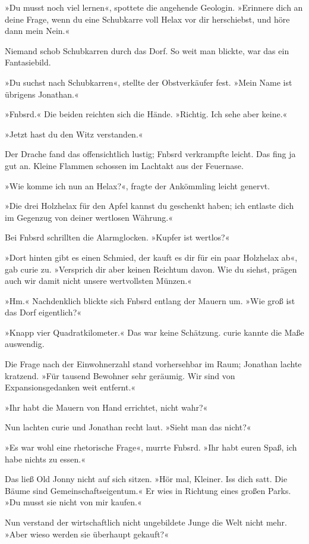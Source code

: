 »Du musst noch viel lernen«, spottete die angehende Geologin. »Erinnere dich an deine Frage, wenn du eine Schubkarre voll Helax vor dir herschiebst, und höre dann mein Nein.«

Niemand schob Schubkarren durch das Dorf. So weit man blickte, war das ein Fantasiebild.

»Du suchst nach Schubkarren«, stellte der Obstverkäufer fest. »Mein Name ist übrigens Jonathan.«

»Fnbsrd.« Die beiden reichten sich die Hände. »Richtig. Ich sehe aber keine.«

»Jetzt hast du den Witz verstanden.«

Der Drache fand das offensichtlich lustig; Fnbsrd verkrampfte leicht. Das fing ja gut an. Kleine Flammen schossen im Lachtakt aus der Feuernase.

»Wie komme ich nun an Helax?«, fragte der Ankömmling leicht genervt.

»Die drei Holzhelax für den Apfel kannst du geschenkt haben; ich entlaste dich im Gegenzug von deiner wertlosen Währung.«

Bei Fnbsrd schrillten die Alarmglocken. »Kupfer ist wertlos?«

»Dort hinten gibt es einen Schmied, der kauft es dir für ein paar Holzhelax ab«, gab curie zu. »Versprich dir aber keinen Reichtum davon. Wie du siehst, prägen auch wir damit nicht unsere wertvollsten Münzen.«

»Hm.« Nachdenklich blickte sich Fnbsrd entlang der Mauern um. »Wie groß ist das Dorf eigentlich?«

»Knapp vier Quadratkilometer.« Das war keine Schätzung. curie kannte die Maße auswendig.

Die Frage nach der Einwohnerzahl stand vorhersehbar im Raum; Jonathan lachte kratzend. »Für tausend Bewohner sehr geräumig. Wir sind von Expansionsgedanken weit entfernt.«

»Ihr habt die Mauern von Hand errichtet, nicht wahr?«

Nun lachten curie und Jonathan recht laut. »Sieht man das nicht?«

»Es war wohl eine rhetorische Frage«, murrte Fnbsrd. »Ihr habt euren Spaß, ich habe nichts zu essen.«

Das ließ Old Jonny nicht auf sich sitzen. »Hör mal, Kleiner. Iss dich satt. Die Bäume sind Gemeinschaftseigentum.« Er wies in Richtung eines großen Parks. »Du musst sie nicht von mir kaufen.«

Nun verstand der wirtschaftlich nicht ungebildete Junge die Welt nicht mehr. »Aber wieso werden sie überhaupt gekauft?«


